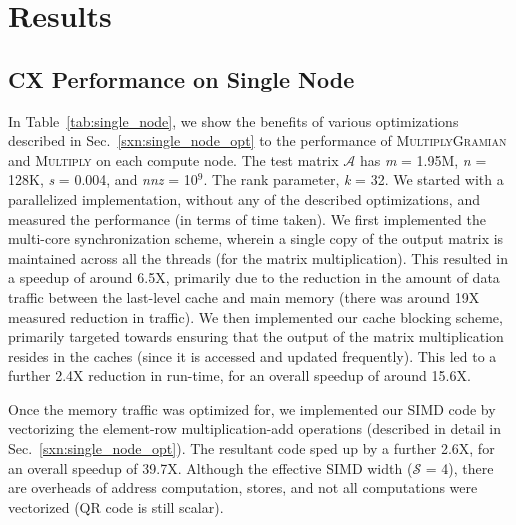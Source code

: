 \section{Results}
\label{sec:results}



\subsection{CX Performance on Single Node}
  \label{sxn:results1}


   
  \vspace*{0.1in}

      In Table~\ref{tab:single_node}, we show the benefits of various
      optimizations described in
      Sec.~\ref{sxn:single_node_opt} to the performance of
      \textsc{MultiplyGramian} and \textsc{Multiply} on each compute node. 
      The test matrix $\mathcal{A}$ has {\it{m}} = 1.95M, {\it{n}} = 128K,
      {\it{s}} = 0.004, and {\it{nnz}} = 10$^9$. The rank parameter,
      {\it{k}} = 32. We started with a parallelized implementation,
      without any of the described optimizations, and measured the
      performance (in terms of time taken). We first implemented the
      multi-core synchronization scheme, wherein a single copy of the
      output matrix is maintained across all the threads (for the matrix multiplication).
      This resulted in a speedup of around 6.5X, primarily due to
      the reduction in the amount of data traffic between the
      last-level cache and main memory (there was around 19X measured reduction
      in traffic). We then implemented our cache blocking scheme,
      primarily targeted towards ensuring that the output of the
      matrix multiplication resides in the caches (since it is
      accessed and updated frequently). This led to a further 2.4X
     reduction in run-time, for an overall speedup of around 15.6X.

     Once the memory traffic was optimized for, we implemented our
     SIMD code by vectorizing the element-row multiplication-add
     operations (described in detail in Sec.~\ref{sxn:single_node_opt}). 
     The resultant code sped up by a further 2.6X, for an overall
     speedup of 39.7X. Although the effective SIMD width
 ($\mathcal{S}$ = 4), there are overheads of address computation,
 stores, and not all computations were vectorized (QR code is still
 scalar).



